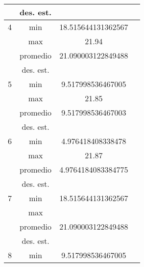\documentclass{report}
\begin{document}
\begin{table}[ht]
\begin{tabular}{|c|c|c|c|}
                              & des. est.                   &            &        \\ \hline
        4                     & min                         &      18.515644131362567      &        \\ \cline{2-4} 
                              & max                         &     21.94       &        \\ \cline{2-4} 
                              & promedio                    &     21.090003122849488       &        \\ \cline{2-4} 
                              & des. est.                   &            &        \\ \hline
        5                     & min                         &    9.517998536467005        &        \\ \cline{2-4} 
                              & max                         &        21.85    &        \\ \cline{2-4} 
                              & promedio                    &      9.517998536467003      &        \\ \cline{2-4} 
                              & des. est.                   &            &        \\ \hline
        6                     & min                         &    4.976418408338478        &        \\ \cline{2-4} 
                              & max                         &        21.87    &        \\ \cline{2-4} 
                              & promedio                    &     4.9764184083384775       &        \\ \cline{2-4} 
                              & des. est.                   &            &        \\ \hline
        7                     & min                         &    18.515644131362567        &        \\ \cline{2-4} 
                              & max                         &            &        \\ \cline{2-4} 
                              & promedio                    &      21.090003122849488      &        \\ \cline{2-4} 
                              & des. est.                   &            &        \\ \hline
        8                     & min                         &      9.517998536467005      &        \\ \cline{2-4} 

\end{tabular}
\end{table}
\end{document}
